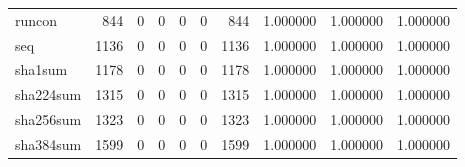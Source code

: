 \begin{longtable}{lrrrrrrrrr}
runcon    &                                 844 &                                               0 &                                              0 &                                             0 &                                              0 &                                          844 &                                           1.000000 &                               1.000000 &                             1.000000 \\
seq       &                                1136 &                                               0 &                                              0 &                                             0 &                                              0 &                                         1136 &                                           1.000000 &                               1.000000 &                             1.000000 \\
sha1sum   &                                1178 &                                               0 &                                              0 &                                             0 &                                              0 &                                         1178 &                                           1.000000 &                               1.000000 &                             1.000000 \\
sha224sum &                                1315 &                                               0 &                                              0 &                                             0 &                                              0 &                                         1315 &                                           1.000000 &                               1.000000 &                             1.000000 \\
sha256sum &                                1323 &                                               0 &                                              0 &                                             0 &                                              0 &                                         1323 &                                           1.000000 &                               1.000000 &                             1.000000 \\
sha384sum &                                1599 &                                               0 &                                              0 &                                             0 &                                              0 &                                         1599 &                                           1.000000 &                               1.000000 &                             1.000000 \\

\end{longtable}
